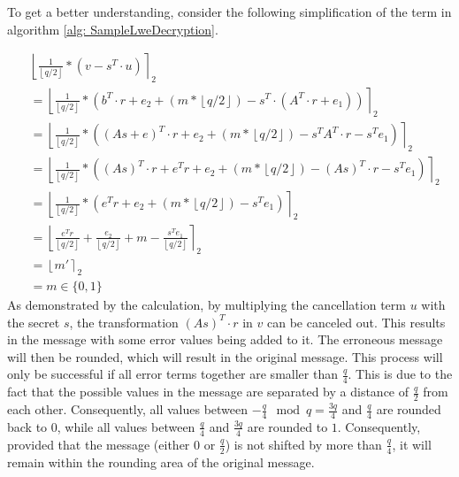 To get a better understanding, consider the following simplification of the term in algorithm \ref{alg: SampleLweDecryption}.

\begin{align*}
   & \left\lfloor \frac{1}{\left\lfloor q/2\right\rfloor}*(v-s^T \cdot u)\right\rceil _2                                                                                     \\
   & = \left\lfloor \frac{1}{\left\lfloor q/2\right\rfloor}*(b^T \cdot r + e_2 + (m*\left\lfloor q/2\right\rfloor)-s^T \cdot (A^T \cdot r + e_1))\right\rceil _2             \\
   & = \left\lfloor \frac{1}{\left\lfloor q/2\right\rfloor}*((As+e)^T \cdot r + e_2 + (m*\left\lfloor q/2\right\rfloor)-s^T A^T \cdot r - s^T e_1)\right\rceil _2            \\
   & = \left\lfloor \frac{1}{\left\lfloor q/2\right\rfloor}*((As)^T \cdot r + e^Tr+ e_2 + (m*\left\lfloor q/2\right\rfloor)-(As)^T \cdot r - s^T e_1)\right\rceil _2         \\
   & = \left\lfloor \frac{1}{\left\lfloor q/2\right\rfloor}*(e^Tr+ e_2 + (m*\left\lfloor q/2\right\rfloor)- s^T e_1)\right\rceil _2                                          \\
   & = \left\lfloor \frac{e^Tr}{\left\lfloor q/2\right\rfloor}+ \frac{e_2 }{\left\lfloor q/2\right\rfloor}+ m - \frac{s^T e_1}{\left\lfloor q/2\right\rfloor}\right\rceil _2 \\
   & = \left\lfloor m' \right\rceil _2                                                                                                                                       \\
   & = m \in \{0,1\}
\end{align*}
As demonstrated by the calculation, by multiplying the cancellation term $u$ with the secret $s$, the transformation $(As)^T \cdot r$ in $v$ can be canceled out. This results in the message with some error values being added to it. The erroneous message will then be rounded, which will result in the original message. This process will only be successful if all error terms together are smaller than $\frac{q}{4}$. This is due to the fact that the possible values in the message are separated by a distance of $\frac{q}{2}$ from each other. Consequently, all values between $-\frac{q}{4}\mod q=\frac{3q}{4}$ and $\frac{q}{4}$ are rounded back to $0$, while all values between $\frac{q}{4}$ and $\frac{3q}{4}$ are rounded to $1$. Consequently, provided that the message (either $0$ or $\frac{q}{2}$) is not shifted by more than $\frac{q}{4}$, it will remain within the rounding area of the original message.

